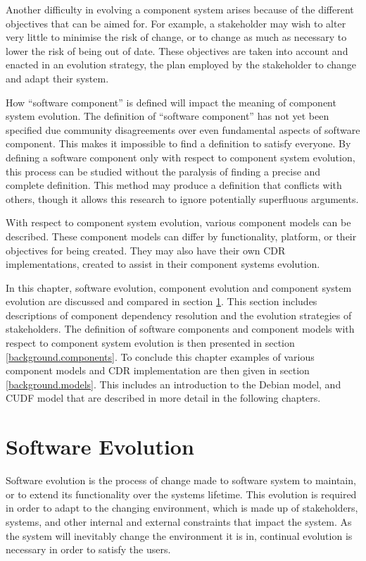 Another difficulty in evolving a component system arises because of the different objectives that can be aimed for.
For example, a stakeholder may wish to alter very little to minimise the risk of change, or to change as much as necessary to lower the risk of being out of date.  
These objectives are taken into account and enacted in an evolution strategy, the plan employed by the stakeholder to change and adapt their system.

How ``software component'' is defined will impact the meaning of component system evolution.
The definition of ``software component'' has not yet been specified due community disagreements over even fundamental aspects of software component.
This makes it impossible to find a definition to satisfy everyone.
By defining a software component only with respect to component system evolution, this process can be studied without the paralysis of finding a precise and complete definition.
This method may produce a definition that conflicts with others, 
though it allows this research to ignore potentially superfluous arguments.

With respect to component system evolution, various component models can be described.
These component models can differ by functionality, platform, or their objectives for being created.
They may also have their own CDR implementations, created to assist in their component systems evolution. 

In this chapter, software evolution, component evolution and component system evolution are discussed and compared in section \ref{background.evolution}.
This section includes descriptions of component dependency resolution and the evolution strategies of stakeholders.
The definition of software components and component models with respect to component system evolution is then presented in section \ref{background.components}.
To conclude this chapter  examples of various component models and CDR implementation are then given in section \ref{background.models}.
This includes an introduction to the Debian model, and CUDF model that are described in more detail in the following chapters.

\section{Software Evolution}
\label{background.evolution}
Software evolution is the process of change made to software system to maintain, or to extend its functionality over the systems lifetime.
This evolution is required in order to adapt to the changing environment, which is made up of stakeholders, systems, and other internal and external constraints that impact the system. 
As the system will inevitably change the environment it is in, continual evolution is necessary in order to satisfy the users. 

